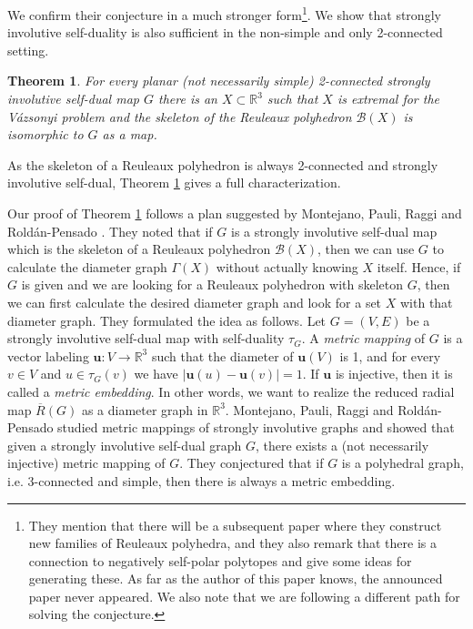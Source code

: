 \documentclass[10pt,a4paper]{article}
\newtheorem{theorem}{Theorem}[section]
\newcommand{\vu}[0]{\mathbf{u}}
\newcommand{\R}[0]{\mathbb{R}}
\newcommand{\Bc}[0]{\mathcal{B}}
\begin{document}
 We confirm their conjecture in a much stronger form\footnote{They mention that there will be a subsequent paper where they construct new families of Reuleaux polyhedra, and they also remark that there is a connection to negatively self-polar polytopes and give some ideas for generating these. As far as the author of this paper knows, the announced paper never appeared. We also note that we are following a different path for solving the conjecture.  
}. We show  that strongly involutive self-duality is also sufficient in the non-simple and only 2-connected setting.



\begin{theorem}\label{thm:main_skeleton}
For every planar (not necessarily simple) 2-connected strongly involutive self-dual map $G$ there is an $X\subset \R^3$ such that $X$ is extremal for the Vázsonyi problem and the skeleton of the Reuleaux polyhedron $\Bc(X)$  is isomorphic to $G$ as a map. 
\end{theorem}



As the skeleton of a Reuleaux polyhedron is always 2-connected and strongly involutive self-dual, Theorem \ref{thm:main_skeleton} gives a full characterization. 

Our proof of Theorem \ref{thm:main_skeleton}  follows a plan suggested by Montejano, Pauli, Raggi and  Roldán-Pensado \cite{montejano2020graphs}. They noted that if $G$ is a strongly involutive self-dual map which is the skeleton of a Reuleaux polyhedron $\Bc(X)$, then we can use $G$ to calculate the diameter graph $\Gamma(X)$ without actually knowing $X$ itself. Hence, if $G$ is given and we are looking for a Reuleaux polyhedron with skeleton $G$, then we can first calculate the desired diameter graph and look for a set $X$ with that diameter graph. They formulated the idea as follows. Let $G=(V,E)$ be a strongly involutive self-dual map with self-duality $\tau_G$.  A \emph{metric mapping} of $G$ is a vector labeling $\vu : V \rightarrow \mathbb{R}^3$ such that the diameter of $\vu(V)$ is 1, and for every $v \in V$ and $u \in \tau_G(v)$ we have $|\vu(u)- \vu(v)| = 1$. If $\vu$ is injective, then it is called a \emph{metric embedding}. In other words, we want to realize the reduced radial map $\overline R(G)$ as a diameter graph in $\R^3$. Montejano, Pauli, Raggi and  Roldán-Pensado studied metric mappings of strongly involutive graphs \cite{montejano2020graphs} and showed that given a strongly involutive self-dual graph $G$, there exists a (not necessarily injective) metric mapping of $G$.  
They conjectured that if $G$ is a polyhedral graph, i.e. 3-connected and simple, then there is always a metric embedding. 
\end{document}
